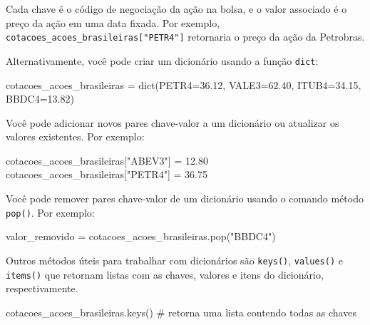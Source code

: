\documentclass[
  portuguese,
  letterpaper,
  DIV=11,
  numbers=noendperiod]{scrreprt}
\newenvironment{Shaded}{\begin{snugshade}}{\end{snugshade}}
\newcommand{\BuiltInTok}[1]{\textcolor[rgb]{0.00,0.23,0.31}{#1}}
\newcommand{\CommentTok}[1]{\textcolor[rgb]{0.37,0.37,0.37}{#1}}
\newcommand{\FloatTok}[1]{\textcolor[rgb]{0.68,0.00,0.00}{#1}}
\newcommand{\NormalTok}[1]{\textcolor[rgb]{0.00,0.23,0.31}{#1}}
\newcommand{\OperatorTok}[1]{\textcolor[rgb]{0.37,0.37,0.37}{#1}}
\newcommand{\StringTok}[1]{\textcolor[rgb]{0.13,0.47,0.30}{#1}}
\theoremstyle{definition}
\theoremstyle{remark}
\begin{document}
Cada chave é o código de negociação da ação na bolsa, e o valor
associado é o preço da ação em uma data fixada. Por exemplo,
\texttt{cotacoes\_acoes\_brasileiras{[}"PETR4"{]}} retornaria o preço da
ação da Petrobras.

Alternativamente, você pode criar um dicionário usando a função
\texttt{dict}:

\begin{Shaded}
\begin{Highlighting}[]
\NormalTok{cotacoes\_acoes\_brasileiras }\OperatorTok{=} \BuiltInTok{dict}\NormalTok{(PETR4}\OperatorTok{=}\FloatTok{36.12}\NormalTok{, VALE3}\OperatorTok{=}\FloatTok{62.40}\NormalTok{, ITUB4}\OperatorTok{=}\FloatTok{34.15}\NormalTok{, BBDC4}\OperatorTok{=}\FloatTok{13.82}\NormalTok{)}
\end{Highlighting}
\end{Shaded}

Você pode adicionar novos pares chave-valor a um dicionário ou atualizar
os valores existentes. Por exemplo:

\begin{Shaded}
\begin{Highlighting}[]
\NormalTok{cotacoes\_acoes\_brasileiras[}\StringTok{"ABEV3"}\NormalTok{] }\OperatorTok{=} \FloatTok{12.80}
\NormalTok{cotacoes\_acoes\_brasileiras[}\StringTok{"PETR4"}\NormalTok{] }\OperatorTok{=} \FloatTok{36.75}
\end{Highlighting}
\end{Shaded}

Você pode remover pares chave-valor de um dicionário usando o comando
método \texttt{pop()}. Por exemplo:

\begin{Shaded}
\begin{Highlighting}[]
\NormalTok{valor\_removido }\OperatorTok{=}\NormalTok{ cotacoes\_acoes\_brasileiras.pop(}\StringTok{"BBDC4"}\NormalTok{)}
\end{Highlighting}
\end{Shaded}

Outros métodos úteis para trabalhar com dicionários são \texttt{keys()},
\texttt{values()} e \texttt{items()} que retornam listas com as chaves,
valores e itens do dicionário, respectivamente.

\begin{Shaded}
\begin{Highlighting}[]
\NormalTok{cotacoes\_acoes\_brasileiras.keys() }\CommentTok{\# retorna uma lista contendo todas as chaves}
\end{Highlighting}
\end{Shaded}
\end{document}
